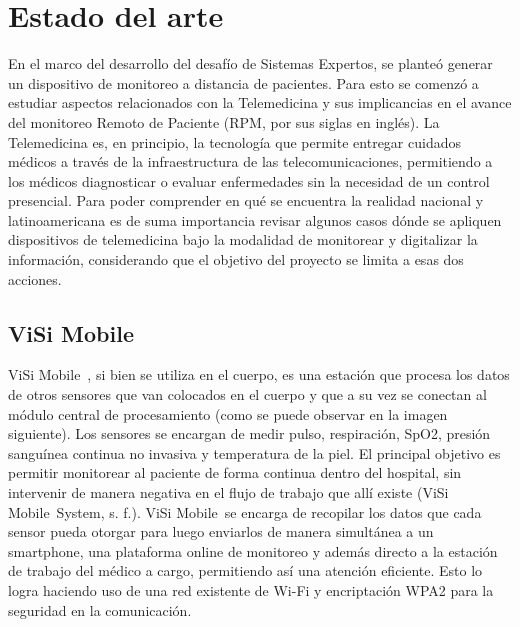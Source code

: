 \chapter{Estado del arte}\label{arte}
En el marco del desarrollo del desafío de Sistemas Expertos, se planteó generar un dispositivo de monitoreo a distancia de pacientes. Para esto se comenzó a estudiar aspectos relacionados con la Telemedicina y sus implicancias en el avance del monitoreo Remoto de Paciente (RPM, por sus siglas en inglés).\newline 
La Telemedicina es, en principio, la tecnología que permite entregar cuidados médicos a través de la infraestructura de las telecomunicaciones, permitiendo a los médicos diagnosticar o evaluar enfermedades sin la necesidad de un control presencial.
Para poder comprender en qué se encuentra la realidad nacional y latinoamericana es de suma importancia revisar algunos casos dónde se apliquen dispositivos de telemedicina bajo la modalidad de monitorear y digitalizar la información, considerando que el objetivo del proyecto se limita a esas dos acciones.

\section{ViSi Mobile\textregistered}
ViSi Mobile\textregistered\ \cite{visi}, si bien se utiliza en el cuerpo, es una estación que procesa los datos de otros sensores que van colocados en el cuerpo y que a su vez se conectan al módulo central de procesamiento (como se puede observar en la imagen siguiente). Los sensores se encargan de medir pulso, respiración, SpO2, presión sanguínea continua no invasiva y temperatura de la piel. El principal objetivo es permitir monitorear al paciente de forma continua dentro del hospital, sin intervenir de manera negativa en el flujo de trabajo que allí existe (ViSi Mobile\textregistered\ System, s. f.). ViSi Mobile\textregistered\ se encarga de recopilar los datos que cada sensor pueda otorgar para luego enviarlos de manera simultánea a un smartphone, una plataforma online de monitoreo y además directo a la estación de trabajo del médico a cargo, permitiendo así una atención eficiente. Esto lo logra haciendo uso de una red existente de Wi-Fi y encriptación WPA2 para la seguridad en la comunicación\cite{visi_tel}.

